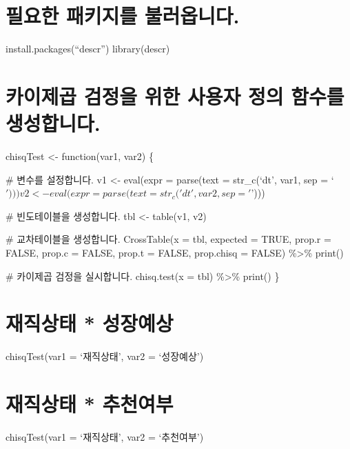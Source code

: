 \documentclass[]{article}
\begin{document}
\section{필요한 패키지를 불러옵니다.}\label{--.-1}

install.packages(``descr'') library(descr)

\section{카이제곱 검정을 위한 사용자 정의 함수를
생성합니다.}\label{------.}

chisqTest \textless{}- function(var1, var2) \{

\# 변수를 설정합니다. v1 \textless{}- eval(expr = parse(text =
str\_c(`dt', var1, sep =
`\(')))  v2 <- eval(expr = parse(text = str_c('dt', var2, sep = '\)')))

\# 빈도테이블을 생성합니다. tbl \textless{}- table(v1, v2)

\# 교차테이블을 생성합니다. CrossTable(x = tbl, expected = TRUE, prop.r
= FALSE, prop.c = FALSE, prop.t = FALSE, prop.chisq = FALSE)
\%\textgreater{}\% print()

\# 카이제곱 검정을 실시합니다. chisq.test(x = tbl) \%\textgreater{}\%
print() \}

\section{재직상태 * 성장예상}\label{-}

chisqTest(var1 = `재직상태', var2 = `성장예상')

\section{재직상태 * 추천여부}\label{-}

chisqTest(var1 = `재직상태', var2 = `추천여부')
\end{document}
